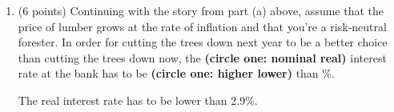 \documentclass[twoside]{article}
\begin{document}
\begin{enumerate}
\begin{enumerate}
    \item \begin{EXAM} (6 points) Continuing with the story from part (a) above, assume that the price of lumber grows at the rate of inflation and that you're a risk-neutral forester. In order for cutting the trees down next year to be a better choice than cutting the trees down now, the {\bf(circle one: nominal   real)} interest rate at the bank has to be {\bf(circle one: higher  lower)} than \underline{\hspace{1in}}\%.  \vspace{1in} \end{EXAM}

\begin{KEY}
The real interest rate has to be lower than 2.9\%.
\end{KEY}

    \end{enumerate}



\end{enumerate}
\end{document}
